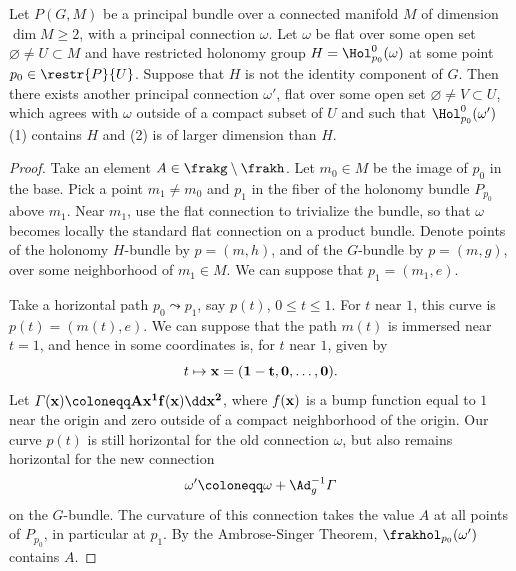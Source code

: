 \begin{lem}\label{lem 16.23 McKay}
    Let $P(G,M)$ be a principal bundle over a connected manifold $M$ of dimension $\dim M\geq 2$, with a principal connection $\omega$. Let $\omega$ be flat over some open set $\varnothing\neq U\subset M$ and have restricted holonomy group $H=\Hol^0_{p_0}(\omega)$ at some point $p_0\in \restr{P}{U}$. Suppose that $H$ is not the identity component of $G$. Then there exists another principal connection $\omega'$, flat over some open set $\varnothing\neq V\subset U$, which agrees with $\omega$ outside of a compact subset of $U$ and such that $\Hol_{p_0}^0(\omega')$ (1) contains $H$ and (2) is of larger dimension than $H$.
\end{lem}
\begin{proof}
    Take an element $A\in \frakg\setminus\frakh$. Let $m_0\in M$ be the image of $p_0$ in the base. Pick a point $m_1\neq m_0$ and $p_1$ in the fiber of the holonomy bundle $P_{p_0}$ above $m_1$. Near $m_1$, use the flat connection to trivialize the bundle, so that $\omega$ becomes locally the standard flat connection on a product bundle. Denote points of the holonomy $H$-bundle by $p=(m,h)$, and of the $G$-bundle by $p=(m,g)$, over some neighborhood of $m_1\in M$. We can suppose that $p_1=(m_1,e)$. 

    Take a horizontal path $p_0\leadsto p_1$, say $p(t)$, $0\leq t\leq 1$. For $t$ near $1$, this curve is $p(t)=(m(t),e)$. We can suppose that the path $m(t)$ is immersed near $t=1$, and hence in some coordinates is, for $t$ near $1$, given by 
    \[t\mapsto \bf{x}=(1-t,0,\ldots,0).\]
    Let $\varGamma(\bf{x})\coloneqq A x^1f(\bf{x})\dd x^2$, where $f(\bf{x})$ is a bump function equal to $1$ near the origin and zero outside of a compact neighborhood of the origin. Our curve $p(t)$ is still horizontal for the old connection $\omega$, but also remains horizontal for the new connection 
    \[\omega'\coloneqq \omega+\Ad_g^{-1}\varGamma\]
    on the $G$-bundle. The curvature of this connection takes the value $A$ at all points of $P_{p_0}$, in particular at $p_1$. By the Ambrose-Singer Theorem, $\frakhol_{p_0}(\omega')$ contains $A$.


\end{proof}
